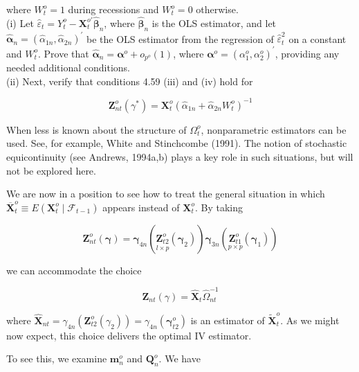 \documentclass[10pt]{article}
\begin{document}
where $W_{t}^{o}=1$ during recessions and $W_{t}^{o}=0$ otherwise.\\
(i) Let $\hat{\varepsilon}_{t}=Y_{t}^{o}-\mathbf{X}_{t}^{o \prime} \hat{\boldsymbol{\beta}}_{n}$, where $\hat{\boldsymbol{\beta}}_{n}$ is the OLS estimator, and let $\hat{\boldsymbol{\alpha}}_{n}= \left(\hat{\alpha}_{1 n}, \hat{\alpha}_{2 n}\right)^{\prime}$ be the OLS estimator from the regression of $\hat{\varepsilon}_{t}^{2}$ on a constant and $W_{t}^{o}$. Prove that $\hat{\boldsymbol{\alpha}}_{n}=\boldsymbol{\alpha}^{o}+o_{p^{o}}(1)$, where $\boldsymbol{\alpha}^{o}=\left(\alpha_{1}^{o}, \alpha_{2}^{o}\right)^{\prime}$, providing any needed additional conditions.\\
(ii) Next, verify that conditions 4.59 (iii) and (iv) hold for

$$
\mathbf{Z}_{n t}^{o}\left(\gamma^{*}\right)=\mathbf{X}_{t}^{o}\left(\hat{\alpha}_{1 n}+\hat{\alpha}_{2 n} W_{t}^{o}\right)^{-1}
$$

When less is known about the structure of $\Omega_{t}^{o}$, nonparametric estimators can be used. See, for example, White and Stinchcombe (1991). The notion of stochastic equicontinuity (see Andrews, 1994a,b) plays a key role in such situations, but will not be explored here.

We are now in a position to see how to treat the general situation in which $\overline{\mathbf{X}}_{t}^{o} \equiv E\left(\mathbf{X}_{t}^{o} \mid \mathcal{F}_{t-1}\right)$ appears instead of $\mathbf{X}_{t}^{o}$. By taking

$$
\mathbf{Z}_{n t}^{o}(\boldsymbol{\gamma})=\boldsymbol{\gamma}_{4 n}\left(\underset{l \times p}{\mathbf{Z}_{t 2}^{o}}\left(\boldsymbol{\gamma}_{2}\right)\right) \boldsymbol{\gamma}_{3 n}\left(\underset{p \times p}{\mathbf{Z}_{t 1}^{o}}\left(\boldsymbol{\gamma}_{1}\right)\right)
$$

we can accommodate the choice

$$
\mathbf{Z}_{n t}(\gamma)=\hat{\mathbf{X}}_{t} \hat{\Omega}_{n t}^{-1}
$$

where $\hat{\mathbf{X}}_{n t}=\gamma_{4 n}\left(\mathbf{Z}_{t 2}^{o}\left(\gamma_{2}\right)\right)=\gamma_{4 n}\left(\boldsymbol{\gamma}_{t 2}^{o}\right)$ is an estimator of $\tilde{\mathbf{X}}_{t}^{o}$. As we might now expect, this choice delivers the optimal IV estimator.

To see this, we examine $\mathbf{m}_{n}^{o}$ and $\mathbf{Q}_{n}^{o}$. We have
\end{document}
